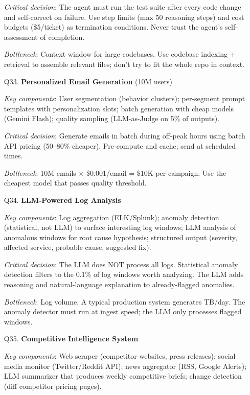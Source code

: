 \begin{enumerate}[leftmargin=*]
    \textit{Critical decision}: The agent must run the test suite after every code change and self-correct on failure. Use step limits (max 50 reasoning steps) and cost budgets (\$5/ticket) as termination conditions. Never trust the agent's self-assessment of completion.

    \textit{Bottleneck}: Context window for large codebases. Use codebase indexing + retrieval to assemble relevant files; don't try to fit the whole repo in context.

    \item[Q33.] \textbf{Personalized Email Generation} (10M users)

    \textit{Key components}: User segmentation (behavior clusters); per-segment prompt templates with personalization slots; batch generation with cheap models (Gemini Flash); quality sampling (LLM-as-Judge on 5\% of outputs).

    \textit{Critical decision}: Generate emails in batch during off-peak hours using batch API pricing (50--80\% cheaper). Pre-compute and cache; send at scheduled times.

    \textit{Bottleneck}: 10M emails $\times$ \$0.001/email = \$10K per campaign. Use the cheapest model that passes quality threshold.

    \item[Q34.] \textbf{LLM-Powered Log Analysis}

    \textit{Key components}: Log aggregation (ELK/Splunk); anomaly detection (statistical, not LLM) to surface interesting log windows; LLM analysis of anomalous windows for root cause hypothesis; structured output (severity, affected service, probable cause, suggested fix).

    \textit{Critical decision}: The LLM does NOT process all logs. Statistical anomaly detection filters to the 0.1\% of log windows worth analyzing. The LLM adds reasoning and natural-language explanation to already-flagged anomalies.

    \textit{Bottleneck}: Log volume. A typical production system generates TB/day. The anomaly detector must run at ingest speed; the LLM only processes flagged windows.

    \item[Q35.] \textbf{Competitive Intelligence System}

    \textit{Key components}: Web scraper (competitor websites, press releases); social media monitor (Twitter/Reddit API); news aggregator (RSS, Google Alerts); LLM summarizer that produces weekly competitive briefs; change detection (diff competitor pricing pages).


\end{enumerate}
